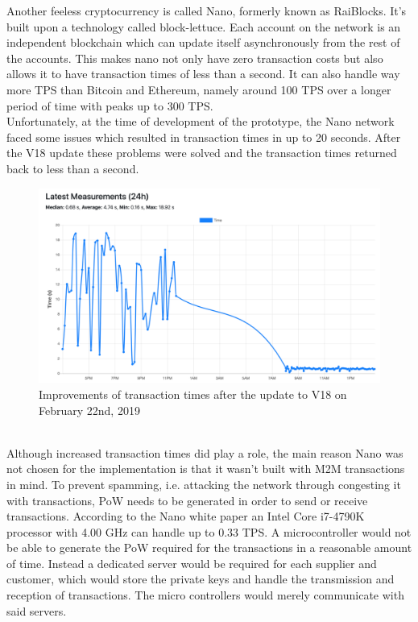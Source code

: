 Another feeless cryptocurrency is called Nano, formerly known as RaiBlocks. It’s built upon a technology called block-lettuce. Each account on the network is an independent blockchain which can update itself asynchronously from the rest of the accounts. This makes nano not only have zero transaction costs but also allows it to have transaction times of less than a second. It can also handle way more TPS than Bitcoin and Ethereum, namely around 100 TPS over a longer period of time with peaks up to 300 TPS\cite{nano-stress-test}.
\\
Unfortunately, at the time of development of the prototype, the Nano network faced some issues which resulted in transaction times in up to 20 seconds. After the V18 update these problems were solved and the transaction times returned back to less than a second\cite{nano-confirmation-time}.
\\
\begin{figure}[h]
    \includegraphics[width=\textwidth]{img/nano-confirmation-time.pdf}
    \caption{Improvements of transaction times after the update to V18 on February 22nd, 2019}
    \label{fig:NanoConfirmationTime}
\end{figure}
\\
Although increased transaction times did play a role, the main reason Nano was not chosen for the implementation is that it wasn’t built with M2M transactions in mind. To prevent spamming, i.e. attacking the network through congesting it with transactions, PoW needs to be generated in order to send or receive transactions. According to the Nano white paper\cite{nano-white-paper} an Intel Core i7-4790K processor with 4.00 GHz can handle up to 0.33 TPS. A microcontroller would not be able to generate the PoW required for the transactions in a reasonable amount of time. Instead a dedicated server would be required for each supplier and customer, which would store the private keys and handle the transmission and reception of transactions. The micro controllers would merely communicate with said servers.
